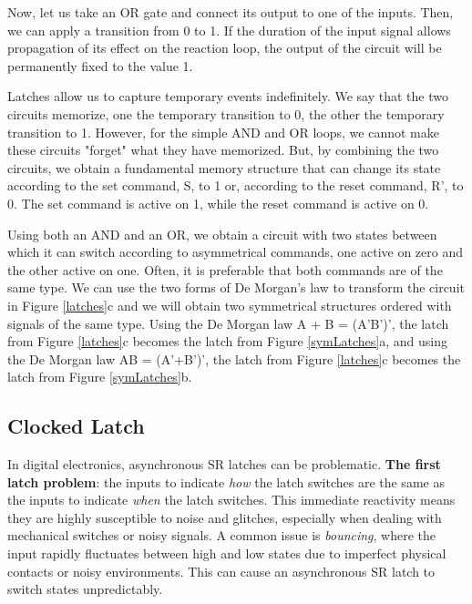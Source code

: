 Now, let us take an OR gate and connect its output to one of the inputs. Then, we can apply a transition from 0 to 1. If the duration of the input signal allows propagation of its effect on the reaction loop, the output of the circuit will be permanently fixed to the value 1.

Latches allow us to capture temporary events indefinitely. We say that the two circuits memorize, one the temporary transition to 0, the other the temporary transition to 1. However, for the simple AND and OR loops, we cannot make these circuits "forget" what they have memorized. But, by combining the two circuits, we obtain a fundamental memory structure that can change its state according to the set command, S, to 1 or, according to the reset command, R', to 0. The set command is active on 1, while the reset command is active on 0.


Using both an AND and an OR, we obtain a circuit with two states between which it can switch according to asymmetrical commands, one active on zero and the other active on one. Often, it is preferable that both commands are of the same type. We can use the two forms of De Morgan's law to transform the circuit in Figure \ref{latches}c and we will obtain two symmetrical structures ordered with signals of the same type. Using the De Morgan law  A + B = (A'B')', the latch from Figure \ref{latches}c becomes the latch from Figure \ref{symLatches}a, and using the De Morgan law AB = (A'+B')', the latch from Figure \ref{latches}c becomes the latch from Figure \ref{symLatches}b.

\subsection{Clocked Latch}
In digital electronics, asynchronous SR latches can be problematic.  {\bf The first latch problem}: the inputs to indicate {\em how} the latch switches are the same as the inputs to
indicate {\em when} the latch switches. This immediate reactivity means they are highly susceptible to noise and glitches, especially when dealing with mechanical switches or noisy signals. A common issue is \textit{bouncing}, where the input rapidly fluctuates between high and low states due to imperfect physical contacts or noisy environments. This can cause an asynchronous SR latch to switch states unpredictably.

